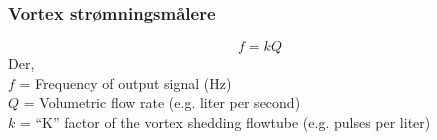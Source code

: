 \documentclass[aspectratio=169,xcolor=dvipsnames]{beamer}
\begin{document}
%
%
%
%
%
%
%
%
\begin{frame}
	\frametitle{Vortex strømningsmålere}
$$f = kQ$$
Der,
\\
$f$ = Frequency of output signal (Hz)
\\
$Q$ = Volumetric flow rate (e.g. liter per second)%
\\
$k$ = ``K'' factor of the vortex shedding flowtube (e.g. pulses per liter)

\end{frame}
%
%
%
\end{document}

